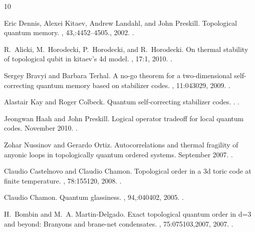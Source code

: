 \documentclass[letterpaper,10pt,pra,aps,showpacs,twocolumn]{revtex4-1}
\theoremstyle{definition} \newtheorem{defn}{Definition}
\theoremstyle{definition} \newtheorem{remark}{Remark}
\begin{document}
\begin{thebibliography}{10}

Eric Dennis, Alexei Kitaev, Andrew Landahl, and John Preskill.
\newblock Topological quantum memory.
, 43,:4452--4505., 2002.
\newblock \href {http://arxiv.org/abs/quant-ph/0110143}
  {}.

R.~Alicki, M.~Horodecki, P.~Horodecki, and R.~Horodecki.
\newblock On thermal stability of topological qubit in kitaev's 4d model.
, 17:1, 2010.
\newblock \href {http://arxiv.org/abs/0811.0033} {}.

Sergey Bravyi and Barbara Terhal.
\newblock A no-go theorem for a two-dimensional self-correcting quantum memory
  based on stabilizer codes.
, 11:043029, 2009.
\newblock \href {http://arxiv.org/abs/0810.1983} {}.

Alastair Kay and Roger Colbeck.
\newblock Quantum self-correcting stabilizer codes.
.
\newblock \href {http://arxiv.org/abs/0810.3557} {}.

Jeongwan Haah and John Preskill.
\newblock Logical operator tradeoff for local quantum codes.
\newblock November 2010.
\newblock \href {http://arxiv.org/abs/1011.3529} {}.

Zohar Nussinov and Gerardo Ortiz.
\newblock Autocorrelations and thermal fragility of anyonic loops in
  topologically quantum ordered systems.
\newblock September 2007.
\newblock \href {http://arxiv.org/abs/0709.2717} {}.

Claudio Castelnovo and Claudio Chamon.
\newblock Topological order in a 3d toric code at finite temperature.
, 78:155120, 2008.
\newblock \href {http://arxiv.org/abs/0804.3591} {}.

Claudio Chamon.
\newblock Quantum glassiness.
, 94,:040402, 2005.
\newblock \href {http://arxiv.org/abs/cond-mat/0404182}
  {}.

H.~Bombin and M.~A. Martin-Delgado.
\newblock Exact topological quantum order in d=3 and beyond: Branyons and
  brane-net condensates.
, 75:075103,2007, 2007.
\newblock \href {http://arxiv.org/abs/cond-mat/0607736}
  {}.


\end{thebibliography}
\end{document}

